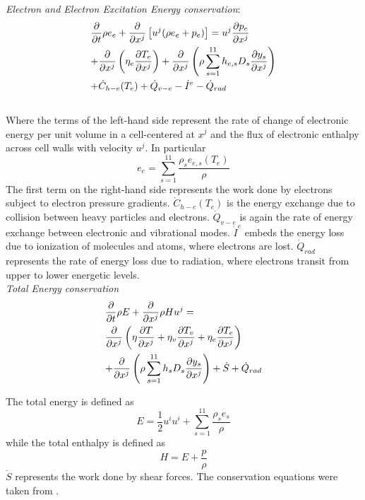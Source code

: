 \documentclass[11pt,a4paper,twocolumn]{article}
\begin{document}
\textit{Electron and Electron Excitation Energy conservation}:
\begin{multline}\label{eq:electronic}
    \frac{\partial}{\partial t}\rho e_e + \frac{\partial}{\partial x^j}\left[ u^j(\rho e_e + p_e)\right] = u^j\frac{\partial p_e}{\partial x^j}\hfill\\+\frac{\partial}{\partial x^j}\left(\eta_e \frac{\partial T_e}{\partial x^j}\right) + \frac{\partial}{\partial x^j}\left(\rho\sum_{s=1}^{11}h_{e,s}D_s\frac{\partial y_s}{\partial x^j} \right)\hfill\\+\dot C_{h-e}(T_e) + \dot Q_{v-e} - \dot I^e -\dot Q_{rad}\hfill
\end{multline}\\
Where the terms of the left-hand side represent the rate of change of electronic energy per unit volume in a cell-centered at $x^j$ and the flux of electronic enthalpy across cell walls with velocity $u^j$. In particular\\
\begin{equation*}
e_e = \sum_{s=1}^{11}\frac{\rho_s e_{e,s}(T_e)}{\rho}
\end{equation*}
The first term on the right-hand side represents the work done by electrons subject to electron pressure gradients. $\dot C_{h-e}(T_e)$ is the energy exchange due to collision between heavy particles and electrons. $\dot Q_{v-e}$ is again the rate of energy exchange between electronic and vibrational modes. $\dot I^e$ embeds the energy loss due to ionization of molecules and atoms, where electrons are lost. $\dot Q_{rad}$ represents the rate of energy loss due to radiation, where electrons transit from upper to lower energetic levels.\\

\textit{Total Energy conservation}
\begin{multline}\label{eq:total}
    \frac{\partial}{\partial t}\rho E + \frac{\partial}{\partial x^j} \rho H u^j =\hfill\\ \frac{\partial}{\partial x^j} \left(\eta\frac{\partial T}{\partial x^j}+\eta_v\frac{\partial T_v}{\partial x^j}+ \eta_e\frac{\partial T_e}{\partial x^j}\right) \hfill\\ +\frac{\partial}{\partial x^j}\left( \rho\sum_{s=1}^{11} h_s D_s \frac{\partial y_s}{\partial x^j} \right)+\dot S + \dot Q_{rad}\hfill
\end{multline}

The total energy is defined as
\begin{equation*}
    E = \frac{1}{2}u^iu^i + \sum_{s=1}^{11}\frac{\rho_s e_s}{\rho}
\end{equation*}
while the total enthalpy is defined as
\begin{equation*}
    H = E + \frac{p}{\rho}
\end{equation*}
$\dot S$ represents the work done by shear forces.
The conservation equations were taken from \cite{lee1984basic}. 
\end{document}
